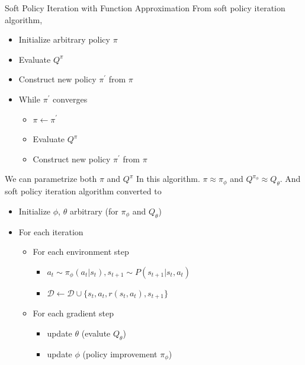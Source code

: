 \documentclass[8pt]{beamer}
\begin{document}
\begin{frame}{Soft Policy Iteration with Function Approximation}
    From soft policy iteration algorithm,
    \begin{itemize}
        \item Initialize arbitrary policy $\pi$
        \item Evaluate $Q^\pi$
        \item Construct new policy $\pi^\prime$ from $\pi$
        \item While $\pi^\prime$ converges
        \begin{itemize}
            \item $\pi \leftarrow \pi^\prime$
            \item Evaluate $Q^\pi$
            \item Construct new policy $\pi^\prime$ from $\pi$
        \end{itemize}
    \end{itemize}

    We can parametrize both $\pi$ and $Q^\pi$ In this algorithm.
    $\pi \approx \pi_\phi$ and $Q^{\pi_\phi} \approx Q_\theta$.
    And soft policy iteration algorithm converted to
    \begin{itemize}
        \item Initialize $\phi$, $\theta$ arbitrary (for $\pi_\phi$ and $Q_\theta$)
        \item For each iteration
        \begin{itemize}
            \item For each environment step
            \begin{itemize}
                \item $a_t \sim \pi_\phi(a_t | s_t), s_{t+1} \sim P(s_{t+1}|s_t, a_t)$
                \item $\mathcal{D} \leftarrow \mathcal{D} \cup \{s_t, a_t, r(s_t, a_t), s_{t+1}\}$            
            \end{itemize}
            \item For each gradient step
            \begin{itemize}
                \item update $\theta$ (evalute $Q_\theta$)
                \item update $\phi$  (policy improvement $\pi_\phi$)
            \end{itemize}
        \end{itemize}
    \end{itemize}
\end{frame}
\end{document}
